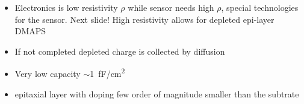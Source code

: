 \begin{frame}
\begin{columns}
\begin{equation*}
                \end{equation*}  
            \end{columns} 
        \medskip 
        \begin{itemize}
            \item Electronics is low resistivity $\rho$ while sensor needs high $\rho$, special technologies for the sensor. Next slide!  High resistivity allows for depleted epi-layer DMAPS
            \item If not completed depleted charge is collected by diffusion
            \item Very low capacity $\sim$\SI{1}{fF/cm\squared}
            \item epitaxial layer with doping few order of magnitude smaller than the subtrate
        \end{itemize}
    \end{frame} 



